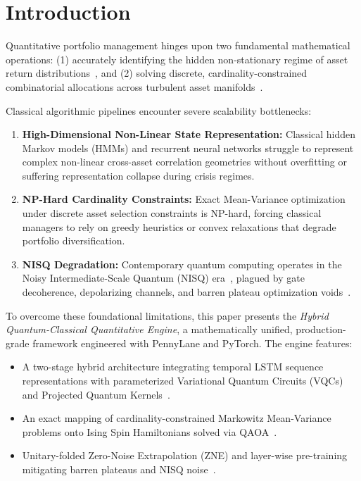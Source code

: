 \section{Introduction}
\label{sec:intro}

Quantitative portfolio management hinges upon two fundamental mathematical operations: (1) accurately identifying the hidden non-stationary regime of asset return distributions~\cite{markowitz1952portfolio}, and (2) solving discrete, cardinality-constrained combinatorial allocations across turbulent asset manifolds~\cite{lucas2014ising}.

Classical algorithmic pipelines encounter severe scalability bottlenecks:
\begin{enumerate}
    \item \textbf{High-Dimensional Non-Linear State Representation:} Classical hidden Markov models (HMMs) and recurrent neural networks struggle to represent complex non-linear cross-asset correlation geometries without overfitting or suffering representation collapse during crisis regimes.
    \item \textbf{NP-Hard Cardinality Constraints:} Exact Mean-Variance optimization under discrete asset selection constraints is NP-hard, forcing classical managers to rely on greedy heuristics or convex relaxations that degrade portfolio diversification.
    \item \textbf{NISQ Degradation:} Contemporary quantum computing operates in the Noisy Intermediate-Scale Quantum (NISQ) era~\cite{temme2017error}, plagued by gate decoherence, depolarizing channels, and barren plateau optimization voids~\cite{mcclean2018barren}.
\end{enumerate}

To overcome these foundational limitations, this paper presents the \textit{Hybrid Quantum-Classical Quantitative Engine}, a mathematically unified, production-grade framework engineered with PennyLane and PyTorch. The engine features:
\begin{itemize}
    \item A two-stage hybrid architecture integrating temporal LSTM sequence representations with parameterized Variational Quantum Circuits (VQCs) and Projected Quantum Kernels~\cite{huang2021power}.
    \item An exact mapping of cardinality-constrained Markowitz Mean-Variance problems onto Ising Spin Hamiltonians solved via QAOA~\cite{farhi2014quantum}.
    \item Unitary-folded Zero-Noise Extrapolation (ZNE) and layer-wise pre-training mitigating barren plateaus and NISQ noise~\cite{skolik2021layerwise}.
\end{itemize}

